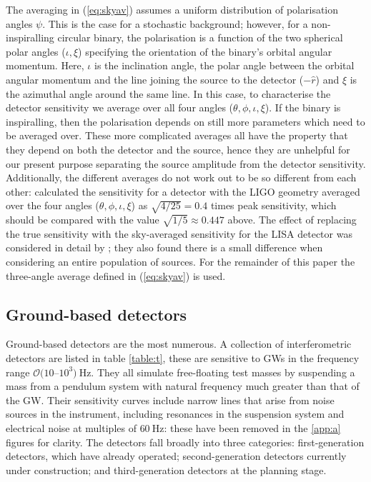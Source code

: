 The averaging in (\ref{eq:skyav}) assumes a uniform distribution of polarisation angles $\psi$. This is the case for a stochastic background; however, for a non-inspiralling circular binary, the polarisation is a function of the two spherical polar angles ($\iota,\xi$) specifying the orientation of the binary's orbital angular momentum. Here, $\iota$ is the inclination angle, the polar angle between the orbital angular momentum and the line joining the source to the detector ($-\hat{r}$) and $\xi$ is the azimuthal angle around the same line. In this case, to characterise the detector sensitivity we average over all four angles ($\theta,\phi,\iota,\xi$). If the binary is inspiralling, then the polarisation depends on still more parameters which need to be averaged over. These more complicated averages all have the property that they depend on both the detector and the source, hence they are unhelpful for our present purpose separating the source amplitude from the detector sensitivity. Additionally, the different averages do not work out to be so different from each other: \citet{1993PhRvD..47.2198F} calculated the sensitivity for a detector with the LIGO geometry averaged over the four angles ($\theta,\phi,\iota,\xi$) as $\sqrt{4/25}=0.4$ times peak sensitivity, which should be compared with the value $\sqrt{1/5}\approx 0.447$ above. The effect of replacing the true sensitivity with the sky-averaged sensitivity for the LISA detector was considered in detail by \cite{2012CQGra..29l4015V}; they also found there is a small difference when considering an entire population of sources. For the remainder of this paper the three-angle average defined in (\ref{eq:skyav}) is used.

\subsection{Ground-based detectors}\label{sec:ground}

Ground-based detectors are the most numerous. A collection of interferometric detectors are listed in table \ref{table:t}, these are sensitive to GWs in the frequency range ${\mathcal{O}}(10$--$10^{3})~\mathrm{Hz}$. They all simulate free-floating test masses by suspending a mass from a pendulum system with natural frequency much greater than that of the GW. Their sensitivity curves include narrow lines that arise from noise sources in the instrument, including resonances in the suspension system and electrical noise at multiples of $60~\mathrm{Hz}$: these have been removed in the \ref{app:a} figures for clarity. The detectors fall broadly into three categories: first-generation detectors, which have already operated; second-generation detectors currently under construction; and third-generation detectors at the planning stage. 

